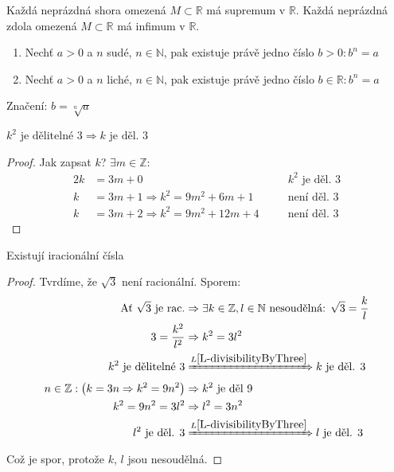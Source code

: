 \begin{definitionAi}\label{D-A3}
	Každá neprázdná shora omezená $M\subset\mathbb{R}$ má supremum v $\mathbb{R}$.
	Každá neprázdná zdola omezená $M\subset\mathbb{R}$ má infimum v $\mathbb{R}$.
\end{definitionAi}

\begin{definition}[Odmocnina]
	\begin{enumerate}
		\item Nechť $a>0$ a $n$ sudé, $n\in\mathbb{N}$, pak existuje právě jedno číslo $b>0: b^n=a$
		\item Nechť $a>0$ a $n$ liché, $n\in\mathbb{N}$, pak existuje právě jedno číslo $b\in\mathbb{R}: b^n=a$
	\end{enumerate}
	Značení: $b=\sqrt[n]{a}$
\end{definition}

\begin{lemmaAlph}\label{L-divisibilityByThree}
	$k^2 \text{ je dělitelné }3\Rightarrow k \text{ je děl. }3$
\end{lemmaAlph}
\begin{proof}
	Jak zapsat $k$? $\exists m\in\mathbb{Z}:$
	\begin{alignat}{2}
		k &= 3m+0 &&k^2\text{ je děl. $3$}\\
		k &= 3m+1 \Rightarrow k^2=9m^2+6m+1 \quad&&\text{není děl. $3$} \\
		k &= 3m+2 \Rightarrow k^2=9m^2+12m+4 \quad&&\text{není děl. $3$}
	\end{alignat}
\end{proof}

\begin{theorem}
	Existují iracionální čísla
\end{theorem}
\begin{proof}
	Tvrdíme, že $\sqrt{3}$ není racionální. Sporem:
	\begin{alignat}{1}
		\text{Ať $\sqrt{3}$ je rac.} &\Rightarrow\exists k\in\mathbb{Z}, l\in\mathbb{N}
			\text{ nesoudělná: }\sqrt{3}=\frac{k}{l} \\
		3=\frac{k^2}{l^2} &\Rightarrow k^2=3l^2 \\
		k^2 \text{ je dělitelné }3 &\xRightarrow{L\ref{L-divisibilityByThree}} k\text{ je děl. }3 \\
		n\in\mathbb{Z}: \left(k=3n\Rightarrow k^2=9n^2\right) &\Rightarrow k^2 \text{ je děl }9 \\
		k^2=9n^2=3l^2 &\Rightarrow l^2=3n^2 \\
		l^2 \text{ je děl. }3 &\xRightarrow{L\ref{L-divisibilityByThree}} l\text{ je děl. }3
	\end{alignat}
	Což je spor, protože $k$, $l$ jsou nesoudělná.
\end{proof}

